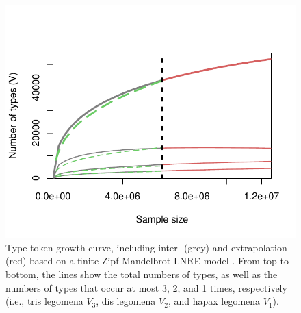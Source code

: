 \documentclass[jou, a4paper]{apa7}
\begin{document}
\begin{figure}[h]
  \centering
    \includegraphics[scale=.6]{figures/df.growth.intrextr-3.5.pdf}
    \caption{Type-token growth curve, including inter- (grey) and extrapolation (red) based on a finite Zipf-Mandelbrot LNRE model \citep[Large Numbers of Rare Events Model][]{evert_simple_2004}. From top to bottom, the lines show the total numbers of types, as well as the numbers of types that occur at most 3, 2, and 1 times, respectively (i.e., tris legomena $V_3$, dis legomena $V_2$, and hapax legomena $V_1$).}
    \label{fig:df.growth.intrextr}
  \hfill
\end{figure}
\end{document}
